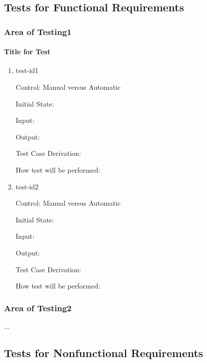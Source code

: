 \documentclass[12pt, titlepage]{article}
\begin{document}
\subsection{Tests for Functional Requirements}



\subsubsection{Area of Testing1}



\paragraph{Title for Test}

\begin{enumerate}

\item{test-id1\\}

Control: Manual versus Automatic
					
Initial State: 
					
Input: 
					
Output: 

Test Case Derivation: 
					
How test will be performed: 
					
\item{test-id2\\}

Control: Manual versus Automatic
					
Initial State: 
					
Input: 
					
Output: 

Test Case Derivation: 

How test will be performed: 

\end{enumerate}

\subsubsection{Area of Testing2}

...

\subsection{Tests for Nonfunctional Requirements}
\end{document}

